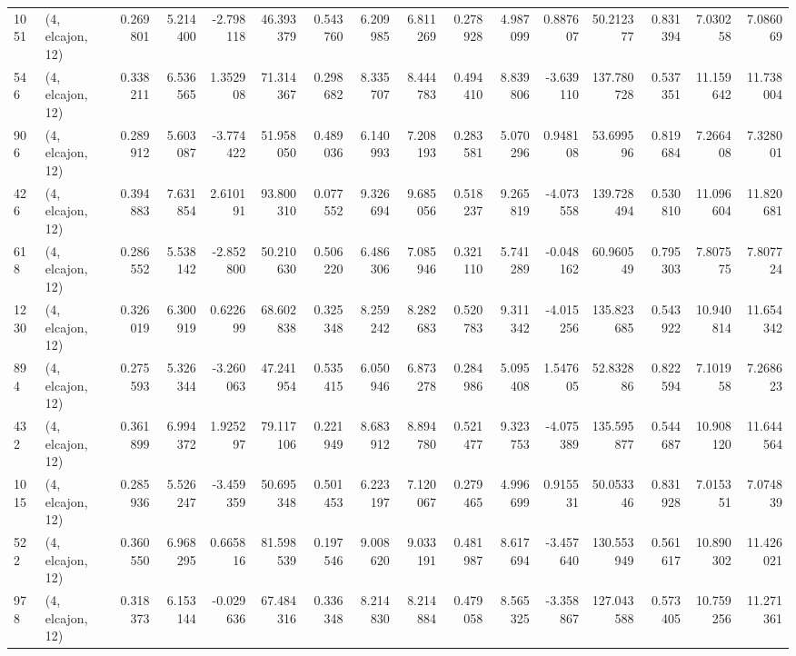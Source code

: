 \begin{tabular}{llrrrrrrrrrrrrrr}
1051 &  (4, elcajon, 12) &   0.269801 &   5.214400 &  -2.798118 &     46.393379 &    0.543760 &    6.209985 &    6.811269 &  0.278928 &   4.987099 &   0.887607 &    50.212377 &   0.831394 &   7.030258 &   7.086069 \\
546  &  (4, elcajon, 12) &   0.338211 &   6.536565 &   1.352908 &     71.314367 &    0.298682 &    8.335707 &    8.444783 &  0.494410 &   8.839806 &  -3.639110 &   137.780728 &   0.537351 &  11.159642 &  11.738004 \\
906  &  (4, elcajon, 12) &   0.289912 &   5.603087 &  -3.774422 &     51.958050 &    0.489036 &    6.140993 &    7.208193 &  0.283581 &   5.070296 &   0.948108 &    53.699596 &   0.819684 &   7.266408 &   7.328001 \\
426  &  (4, elcajon, 12) &   0.394883 &   7.631854 &   2.610191 &     93.800310 &    0.077552 &    9.326694 &    9.685056 &  0.518237 &   9.265819 &  -4.073558 &   139.728494 &   0.530810 &  11.096604 &  11.820681 \\
618  &  (4, elcajon, 12) &   0.286552 &   5.538142 &  -2.852800 &     50.210630 &    0.506220 &    6.486306 &    7.085946 &  0.321110 &   5.741289 &  -0.048162 &    60.960549 &   0.795303 &   7.807575 &   7.807724 \\
1230 &  (4, elcajon, 12) &   0.326019 &   6.300919 &   0.622699 &     68.602838 &    0.325348 &    8.259242 &    8.282683 &  0.520783 &   9.311342 &  -4.015256 &   135.823685 &   0.543922 &  10.940814 &  11.654342 \\
894  &  (4, elcajon, 12) &   0.275593 &   5.326344 &  -3.260063 &     47.241954 &    0.535415 &    6.050946 &    6.873278 &  0.284986 &   5.095408 &   1.547605 &    52.832886 &   0.822594 &   7.101958 &   7.268623 \\
432  &  (4, elcajon, 12) &   0.361899 &   6.994372 &   1.925297 &     79.117106 &    0.221949 &    8.683912 &    8.894780 &  0.521477 &   9.323753 &  -4.075389 &   135.595877 &   0.544687 &  10.908120 &  11.644564 \\
1015 &  (4, elcajon, 12) &   0.285936 &   5.526247 &  -3.459359 &     50.695348 &    0.501453 &    6.223197 &    7.120067 &  0.279465 &   4.996699 &   0.915531 &    50.053346 &   0.831928 &   7.015351 &   7.074839 \\
522  &  (4, elcajon, 12) &   0.360550 &   6.968295 &   0.665816 &     81.598539 &    0.197546 &    9.008620 &    9.033191 &  0.481987 &   8.617694 &  -3.457640 &   130.553949 &   0.561617 &  10.890302 &  11.426021 \\
978  &  (4, elcajon, 12) &   0.318373 &   6.153144 &  -0.029636 &     67.484316 &    0.336348 &    8.214830 &    8.214884 &  0.479058 &   8.565325 &  -3.358867 &   127.043588 &   0.573405 &  10.759256 &  11.271361 \\

\end{tabular}

